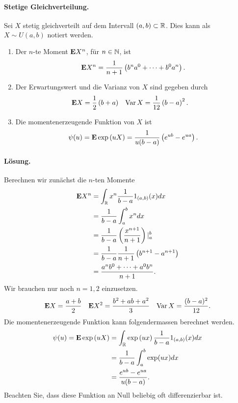 \paragraph{Stetige Gleichverteilung.}
Sei $X$ stetig gleichverteilt auf dem Intervall $\left( a,b \right)\subset \mathbb R$.  
Dies kann als $X \sim U(a,b)$ notiert werden. 
\begin{enumerate}
    \item Der $n$-te Moment $\mathbf{E} X^{n}$, für $n\in\mathbb N$, ist 
        \begin{equation*}
            \mathbf{E} X^n = \frac{1}{n+1}\left( b^{n}a^0 + \cdots + b^{0}a^{n} \right).
        \end{equation*}
    \item Der Erwartungswert und die Varianz von $X$ sind gegeben durch
        \begin{align*}
            \mathbf{E} X    & = \frac{1}{2} \left( b+a \right) & 
            \operatorname{Var} X  & = \frac{1}{12} \left( b-a \right)^{2}.  
        \end{align*}
    \item Die momentenerzeugende Funktion von $X$ ist 
        \begin{equation*}
            \psi(u) = \mathbf{E} \exp \left( u X \right) = \frac{1}{u(b-a)}\left( e^{ub} - e^{ua} \right).
        \end{equation*}
\end{enumerate}
\paragraph*{Lösung.} Berechnen wir zunächst die $n$-ten Momente
\begin{align*}
    \mathbf{E} X^n &= \int_{\mathbb R}^{} x^n \frac{1}{b-a} 1_{(a,b)}(x) dx \\
    &= \frac{1}{b-a} \int_{a}^{b} x^n dx \\
    &= \frac{1}{b-a} \left( \frac{x^{n+1}}{n+1} \right) |_{a}^{b} \\
    &= \frac{1}{b-a}\frac{1}{n+1} \left( b^{n+1}-a^{n+1} \right) \\
    &= \frac{a^n b^{0} +\cdots+ a^0 b^{n}}{n+1}.
\end{align*}
Wir brauchen nur noch $n=1,2$ einzusetzen.
\begin{align*}
    \mathbf{E} X &= \frac{a+b}{2} & \mathbf{E} X^2 &= \frac{b^2 + ab + a^2}{3} & 
    \operatorname{Var} X = \frac{(b-a)^2}{12}.
\end{align*}
Die momentenerzeugende Funktion kann folgendermassen berechnet werden. 
\begin{align*}
    \psi(u) = \mathbf{E} \exp\left( uX \right) &= 
    \int_{\mathbb R} \exp \left( ux \right) \frac{1}{b-a} 1_{(a,b)}(x) dx \\
    &= \frac{1}{b-a} \int_{a}^{b} \exp (ux) dx \\
    &= \frac{e^{ub}-e^{ua}}{u(b-a)}.
\end{align*}
Beachten Sie, dass diese Funktion an Null beliebig oft differenzierbar ist. 


